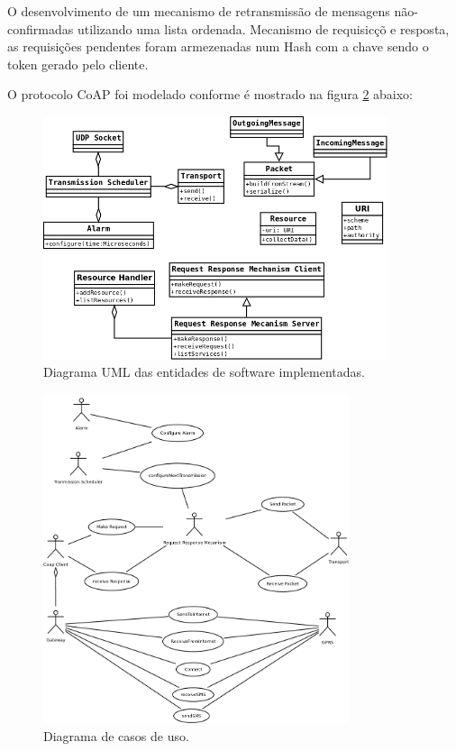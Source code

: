 O desenvolvimento de um mecanismo de retransmiss\~ao de mensagens n\~ao-confirmadas utilizando uma lista ordenada. Mecanismo de requisic\c{c}\~o e resposta, as requisi\c{c}\~oes pendentes foram armezenadas num Hash com a chave sendo o token gerado pelo cliente.

O protocolo CoAP foi modelado conforme \'e mostrado na figura \ref{uml} abaixo:
\begin{figure}[h]
   \label{uml}
   \centering
   \includegraphics[width=0.9\textwidth]{figuras/uml.png}
   \caption{Diagrama UML das entidades de software implementadas.}
\end{figure}


\begin{figure}[h]
   \label{uml}
   \centering
   \includegraphics[width=0.8\textwidth]{figuras/casodeuso.png}
   \caption{Diagrama de casos de uso.}
\end{figure}

